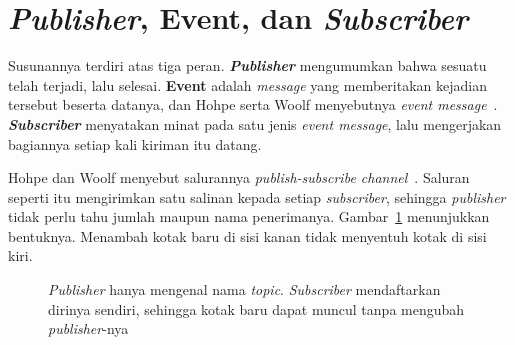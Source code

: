 \section{\textit{Publisher}, Event, dan \textit{Subscriber}}

Susunannya terdiri atas tiga peran.
\textbf{\textit{Publisher}} mengumumkan bahwa
sesuatu
telah terjadi, lalu selesai. \textbf{Event} adalah \textit{message} yang memberitakan
kejadian tersebut beserta datanya, dan Hohpe serta Woolf menyebutnya
\textit{event message}~\cite{hohpe2003eip}.
\textbf{\textit{Subscriber}} menyatakan minat pada
satu jenis \textit{event message}, lalu mengerjakan bagiannya setiap kali kiriman itu
datang.

Hohpe dan Woolf menyebut salurannya \textit{publish-subscribe
channel}~\cite{hohpe2003eip}. Saluran seperti itu mengirimkan satu salinan
kepada setiap \textit{subscriber}, sehingga \textit{publisher} tidak perlu tahu jumlah maupun nama
penerimanya. Gambar~\ref{fig:event-alur} menunjukkan bentuknya. Menambah kotak
baru di sisi kanan tidak menyentuh kotak di sisi kiri.

\begin{figure}[htbp]
  \centering
  \caption{\textit{Publisher} hanya mengenal nama \textit{topic}. \textit{Subscriber} mendaftarkan dirinya
    sendiri, sehingga kotak baru dapat muncul tanpa mengubah \textit{publisher}-nya}
  \label{fig:event-alur}
\end{figure}

